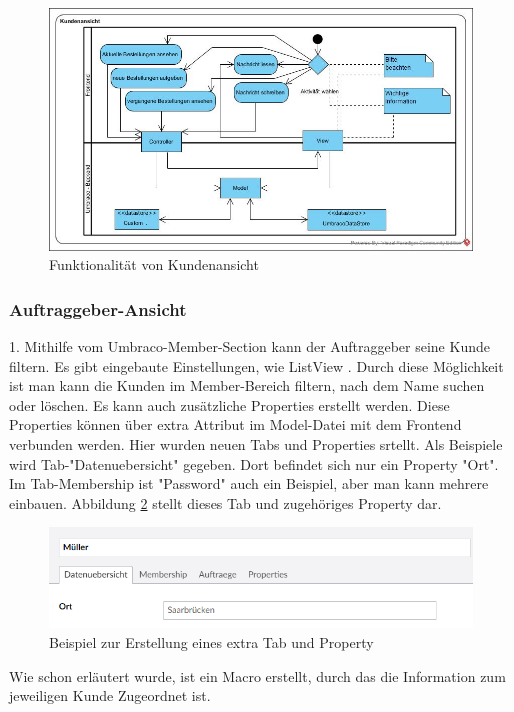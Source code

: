 \begin{figure}[h]
	\centering
	\includegraphics[width=1\linewidth]{Graphics/KundenansichtNeu.jpg}
	\caption[Funktionalität von Kundenansicht]{Funktionalität von Kundenansicht}
	\label{fig:KundenansichtNeu}
\end{figure}

\subsubsection{Auftraggeber-Ansicht}
  
1. Mithilfe vom Umbraco-Member-Section kann der Auftraggeber seine Kunde filtern. Es gibt eingebaute Einstellungen, wie ListView \cite{UmbracoTV2018ListView}. Durch diese Möglichkeit ist man kann die Kunden im Member-Bereich filtern, nach dem Name suchen oder löschen. Es kann auch zusätzliche Properties erstellt werden. Diese Properties können über extra Attribut im Model-Datei mit dem Frontend verbunden werden.
Hier wurden neuen Tabs und Properties srtellt. Als Beispiele wird Tab-"Datenuebersicht" gegeben. Dort befindet sich nur ein Property "Ort". Im Tab-Membership ist "Password" auch ein Beispiel, aber man kann mehrere einbauen. Abbildung \ref{fig:auftraggeberAnsichtDaten} stellt dieses Tab und zugehöriges Property dar.

\begin{figure}[h]
	\centering
	\includegraphics[width=1\linewidth]{Graphics/auftraggeberAnsichtDaten.png}
	\caption[Kundeansicht]{Beispiel zur Erstellung eines extra Tab und Property}
	\label{fig:auftraggeberAnsichtDaten}
\end{figure}
 Wie schon erläutert wurde, ist ein Macro erstellt, durch das die Information zum jeweiligen Kunde Zugeordnet ist. 

